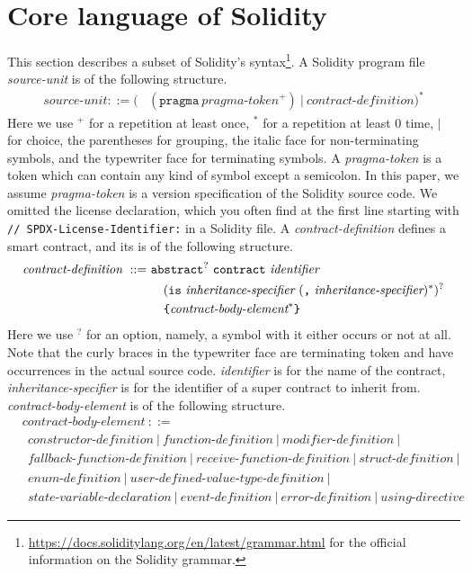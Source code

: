 \documentclass{article}
\begin{document}
\section{Core language of Solidity}
This section describes a subset of Solidity's syntax\footnote{\url{https://docs.soliditylang.org/en/latest/grammar.html} for the official information on the Solidity grammar.}.
A Solidity program file \textit{source-unit} is of the following structure.
\begin{align*}
  \textit{source-unit} ::= ( & (\texttt{pragma}~\textit{pragma-token}^+ ) ~|~ \textit{contract-definition})^*
\end{align*}
Here we use \({}^+\) for a repetition at least once, \({}^*\) for a repetition at least 0 time, \(|\) for choice, the parentheses for grouping, the italic face for non-terminating symbols, and the typewriter face for terminating symbols.
A \textit{pragma-token} is a token which can contain any kind of symbol except a semicolon.
In this paper, we assume \textit{pragma-token} is a version specification of the Solidity source code.  We omitted the license declaration, which you
often find at the first line starting with \texttt{// SPDX-License-Identifier:} in a Solidity file.
A \textit{contract-definition} defines a smart contract, and its is of the following structure.
\begin{align*}
 \textit{contract-definition} ~::=~ & \texttt{abstract}^{?}~\texttt{contract} ~\textit{identifier} \\
  & \quad (\texttt{is}~\textit{inheritance-specifier}~(\texttt{,}~\textit{inheritance-specifier})^{*})^? \\
  & \quad \mbox{\tt\{} \textit{contract-body-element}^* \mbox{\tt\}}
\end{align*}
Here we use \({}^?\) for an option, namely, a symbol with it either occurs or not at all.  Note that the curly braces in the typewriter face are terminating token and have occurrences in the actual source code.
\textit{identifier} is for the name of the contract, \textit{inheritance-specifier} is for the identifier of a super contract to inherit from.
\textit{contract-body-element} is of the following structure.
\begin{align*}
  & \textit{contract-body-element} ~::=~ \\
  & ~~  \textit{constructor-definition} ~|~ 
\textit{function-definition} ~|~ \textit{modifier-definition} ~|~ \\
& ~~  \textit{fallback-function-definition} ~|~ 
 \textit{receive-function-definition} ~|~
\textit{struct-definition} ~|~ \\
& ~~  \textit{enum-definition} ~|~ 
\textit{user-defined-value-type-definition} ~|~ \\
& ~~ \textit{state-variable-declaration} ~|~
\textit{event-definition} ~|~ 
\textit{error-definition} ~|~
\textit{using-directive}
\end{align*}
\end{document}
